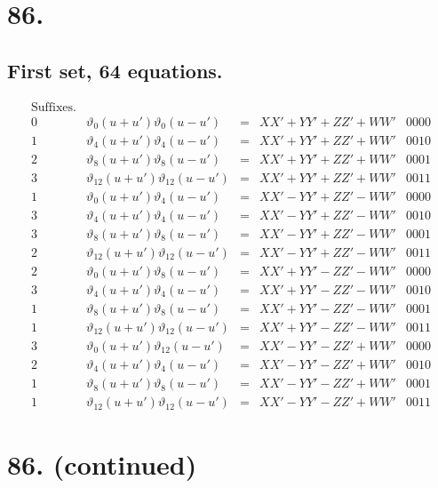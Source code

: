 \documentclass[11pt,a4paper]{article}
\newcommand{\uth}[1]{\vartheta_{#1}}
\begin{document}
\newpage
\section*{86.}
\label{sec:86}

\subsection*{First set, 64 equations.}

\[
\begin{array}{ccccc}
\text{Suffixes.} & & & & \\
\hline
0 & \uth{0}(u+u')\uth{0}(u-u') &=& XX' + YY' + ZZ' + WW' & 0000 \\
1 & \uth{4}(u+u')\uth{4}(u-u') &=& XX' + YY' + ZZ' + WW' & 0010 \\
2 & \uth{8}(u+u')\uth{8}(u-u') &=& XX' + YY' + ZZ' + WW' & 0001 \\
3 & \uth{12}(u+u')\uth{12}(u-u') &=& XX' + YY' + ZZ' + WW' & 0011 \\
\hline
1 & \uth{0}(u+u')\uth{4}(u-u') &=& XX' - YY' + ZZ' - WW' & 0000 \\
3 & \uth{4}(u+u')\uth{4}(u-u') &=& XX' - YY' + ZZ' - WW' & 0010 \\
3 & \uth{8}(u+u')\uth{8}(u-u') &=& XX' - YY' + ZZ' - WW' & 0001 \\
2 & \uth{12}(u+u')\uth{12}(u-u') &=& XX' - YY' + ZZ' - WW' & 0011 \\
\hline
2 & \uth{0}(u+u')\uth{8}(u-u') &=& XX' + YY' - ZZ' - WW' & 0000 \\
3 & \uth{4}(u+u')\uth{4}(u-u') &=& XX' + YY' - ZZ' - WW' & 0010 \\
1 & \uth{8}(u+u')\uth{8}(u-u') &=& XX' + YY' - ZZ' - WW' & 0001 \\
1 & \uth{12}(u+u')\uth{12}(u-u') &=& XX' + YY' - ZZ' - WW' & 0011 \\
\hline
3 & \uth{0}(u+u')\uth{12}(u-u') &=& XX' - YY' - ZZ' + WW' & 0000 \\
2 & \uth{4}(u+u')\uth{4}(u-u') &=& XX' - YY' - ZZ' + WW' & 0010 \\
1 & \uth{8}(u+u')\uth{8}(u-u') &=& XX' - YY' - ZZ' + WW' & 0001 \\
1 & \uth{12}(u+u')\uth{12}(u-u') &=& XX' - YY' - ZZ' + WW' & 0011
\end{array}
\]


\newpage
\section*{86. (continued)}
\label{sec:86cont}
\end{document}
